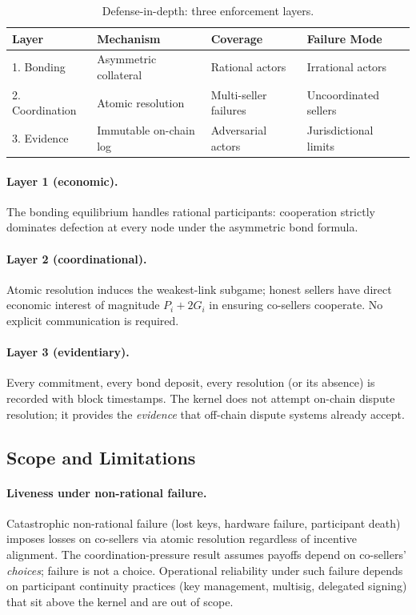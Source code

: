 \documentclass[11pt,a4paper]{article}
\theoremstyle{definition}
\theoremstyle{remark}
\newcommand{\pay}{P}
\newcommand{\cumval}{G}
\begin{document}
\begin{table}[ht]
\centering
\caption{Defense-in-depth: three enforcement layers.}
\label{tab:enforcement}
\begin{tabular}{llll}
\toprule
\textbf{Layer} & \textbf{Mechanism} & \textbf{Coverage} & \textbf{Failure Mode} \\
\midrule
1. Bonding & Asymmetric collateral & Rational actors & Irrational actors \\
2. Coordination & Atomic resolution & Multi-seller failures & Uncoordinated sellers \\
3. Evidence & Immutable on-chain log & Adversarial actors & Jurisdictional limits \\
\bottomrule
\end{tabular}
\end{table}

\paragraph{Layer 1 (economic).}
The bonding equilibrium handles rational participants: cooperation
strictly dominates defection at every node under the asymmetric
bond formula.

\paragraph{Layer 2 (coordinational).}
Atomic resolution induces the weakest-link subgame; honest sellers
have direct economic interest of magnitude $\pay_i + 2\cumval_i$ in
ensuring co-sellers cooperate. No explicit communication is required.

\paragraph{Layer 3 (evidentiary).}
Every commitment, every bond deposit, every resolution (or its
absence) is recorded with block timestamps. The kernel does not
attempt on-chain dispute resolution; it provides the \emph{evidence}
that off-chain dispute systems already accept.

\subsection{Scope and Limitations}

\paragraph{Liveness under non-rational failure.}
Catastrophic non-rational failure (lost keys, hardware failure,
participant death) imposes losses on co-sellers via atomic
resolution regardless of incentive alignment. The
coordination-pressure result assumes payoffs depend on co-sellers'
\emph{choices}; failure is not a choice. Operational reliability
under such failure depends on participant continuity practices (key
management, multisig, delegated signing) that sit above the kernel
and are out of scope.
\end{document}
